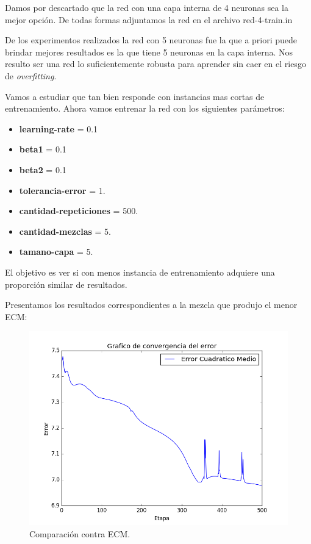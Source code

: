 \documentclass[onecolumn,10pt]{article}
\begin{document}
Damos por descartado que la red con una capa interna de 4 neuronas sea la mejor opción.
De todas formas adjuntamos la red en el archivo red-4-train.in

De los experimentos realizados la red con 5 neuronas fue la que a priori puede brindar
mejores resultados es la que tiene 5 neuronas en la capa interna. Nos resulto ser una red lo suficientemente robusta para aprender sin caer en el riesgo de \emph{overfitting}.

Vamos a estudiar que tan bien responde con instancias mas cortas de entrenamiento. Ahora vamos
entrenar la red con los siguientes parámetros:

\begin{itemize}
\item \textbf{learning-rate} = 0.1
\item \textbf{beta1} = 0.1
\item \textbf{beta2} = 0.1
\item \textbf{tolerancia-error} = 1.
\item \textbf{cantidad-repeticiones} = 500.
\item \textbf{cantidad-mezclas} = 5.
\item \textbf{tamano-capa} = 5.
\end{itemize}

El objetivo es ver si con menos instancia de entrenamiento adquiere una proporción
similar de resultados.

Presentamos los resultados correspondientes a la mezcla que produjo
el menor ECM:


\begin{figure}[H]
  \centering
  \includegraphics[width=0.7\columnwidth]{red_5_ecm_reducida.png}
  \caption{Comparación contra ECM.}
  \label{fig:red 5 ECM}
\end{figure}
\end{document}
